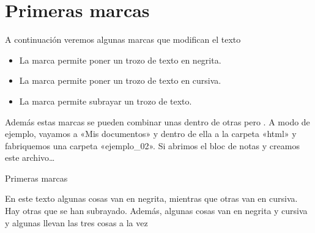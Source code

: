 \documentclass[a4paper,12pt,spanish]{sphinxmanual}
\begin{document}
\chapter{Primeras marcas}
\label{\detokenize{index:primeras-marcas}}
A continuación veremos algunas marcas que modifican el texto
\begin{itemize}
\item {} 
La marca  permite poner un trozo de texto en negrita.

\item {} 
La marca  permite poner un trozo de texto en cursiva.

\item {} 
La marca  permite subrayar un trozo de texto.

\end{itemize}

Además estas marcas se pueden combinar unas dentro de otras pero . A modo de ejemplo, vayamos a «Mis documentos» y dentro de ella a la carpeta «html» y fabriquemos una carpeta «ejemplo\_02». Si abrimos el bloc de notas y creamos este archivo…

%
\begin{sphinxVerbatim}[commandchars=\\\{\}]
    Primeras marcas

En este texto algunas cosas van en negrita,
mientras que otras van en cursiva. Hay otras que
se han subrayado. Además, algunas cosas
van en negrita y cursiva y algunas
llevan las tres cosas a la vez
\end{sphinxVerbatim}
\end{document}
